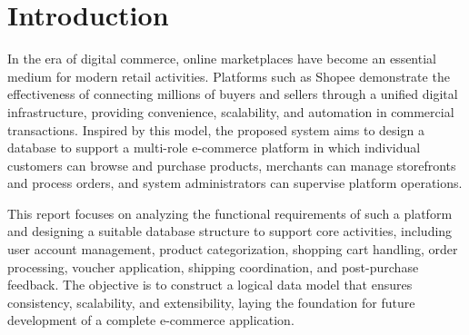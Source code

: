 \section{Introduction}

In the era of digital commerce, online marketplaces have become an essential medium for modern retail activities. Platforms such as Shopee demonstrate the effectiveness of connecting millions of buyers and sellers through a unified digital infrastructure, providing convenience, scalability, and automation in commercial transactions. Inspired by this model, the proposed system aims to design a database to support a multi-role e-commerce platform in which individual customers can browse and purchase products, merchants can manage storefronts and process orders, and system administrators can supervise platform operations.

This report focuses on analyzing the functional requirements of such a platform and designing a suitable database structure to support core activities, including user account management, product categorization, shopping cart handling, order processing, voucher application, shipping coordination, and post-purchase feedback. The objective is to construct a logical data model that ensures consistency, scalability, and extensibility, laying the foundation for future development of a complete e-commerce application.
